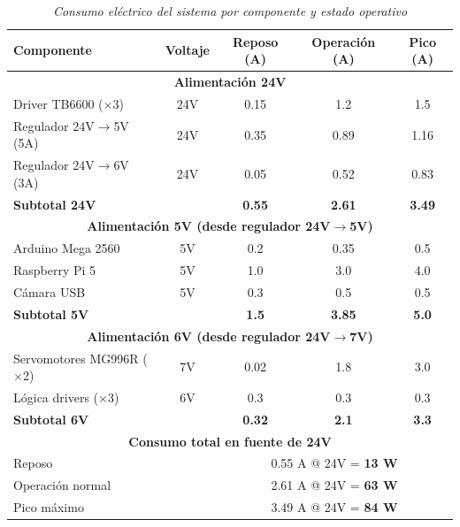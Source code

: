 \begin{table}[H]
\centering
\small
\begin{tabular}{|l|c|c|c|c|}
\hline
\textbf{Componente} & \textbf{Voltaje} & \textbf{Reposo (A)} & \textbf{Operación (A)} & \textbf{Pico (A)} \\
\hline
\multicolumn{5}{|c|}{\textbf{Alimentación 24V}} \\
\hline
Driver TB6600 ($\times$3) & 24V & 0.15 & 1.2 & 1.5 \\
\hline
Regulador 24V$\rightarrow$5V (5A)& 24V & 0.35 & 0.89 & 1.16 \\
\hline
Regulador 24V$\rightarrow$6V (3A)& 24V & 0.05 & 0.52 & 0.83 \\
\hline
\multicolumn{2}{|l|}{\textbf{Subtotal 24V}} & \textbf{0.55} & \textbf{2.61} & \textbf{3.49} \\
\hline
\hline
\multicolumn{5}{|c|}{\textbf{Alimentación 5V (desde regulador 24V$\rightarrow$5V)}} \\
\hline
Arduino Mega 2560 & 5V & 0.2 & 0.35 & 0.5 \\
\hline
Raspberry Pi 5 & 5V & 1.0 & 3.0 & 4.0 \\
\hline
Cámara USB & 5V & 0.3 & 0.5 & 0.5 \\
\hline
\multicolumn{2}{|l|}{\textbf{Subtotal 5V}} & \textbf{1.5} & \textbf{3.85} & \textbf{5.0} \\
\hline
\hline
\multicolumn{5}{|c|}{\textbf{Alimentación 6V (desde regulador 24V$\rightarrow$7V)}} \\
\hline
Servomotores MG996R ($\times$2) & 7V & 0.02 & 1.8 & 3.0 \\
\hline
Lógica drivers ($\times$3) & 6V & 0.3 & 0.3 & 0.3 \\
\hline
\multicolumn{2}{|l|}{\textbf{Subtotal 6V}} & \textbf{0.32} & \textbf{2.1} & \textbf{3.3} \\
\hline
\hline
\multicolumn{5}{|c|}{\textbf{Consumo total en fuente de 24V}} \\
\hline
\multicolumn{2}{|l|}{Reposo} & \multicolumn{3}{c|}{0.55 A @ 24V = \textbf{13 W}} \\
\hline
\multicolumn{2}{|l|}{Operación normal} & \multicolumn{3}{c|}{2.61 A @ 24V = \textbf{63 W}} \\
\hline
\multicolumn{2}{|l|}{Pico máximo} & \multicolumn{3}{c|}{3.49 A @ 24V = \textbf{84 W}} \\
\hline
\end{tabular}
\caption{\textit{Consumo eléctrico del sistema por componente y estado operativo}}
\label{tab:consumo_energetico_prototipo}
\end{table}


